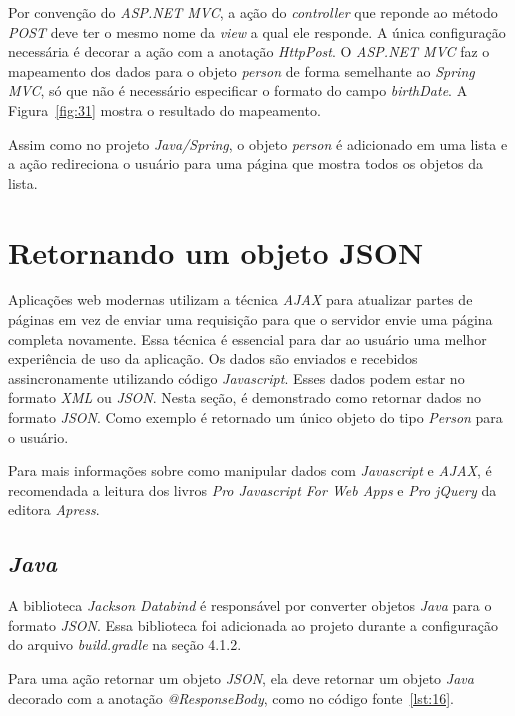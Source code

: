 Por convenção do \textit{ASP.NET MVC}, a ação do \textit{controller} que reponde ao método \textit{POST} deve ter o mesmo nome da \textit{view} a qual ele responde.  A única configuração necessária é decorar a ação com a anotação \textit{HttpPost}. O \textit{ASP.NET MVC} faz o mapeamento dos dados para o objeto \textit{person} de forma semelhante ao \textit{Spring MVC}, só que não é necessário especificar o formato do campo \textit{birthDate}. A Figura~\ref{fig:31} mostra o resultado do mapeamento.


Assim como no projeto \textit{Java/Spring}, o objeto \textit{person} é adicionado em uma lista e a ação redireciona o usuário para uma página que mostra todos os objetos da lista.

\section{Retornando um objeto JSON}

Aplicações web modernas utilizam a técnica \textit{AJAX} para atualizar partes de páginas em vez de enviar uma requisição para que o servidor envie uma página completa novamente. Essa técnica é essencial para dar ao usuário uma melhor experiência de uso da aplicação. Os dados são enviados e recebidos assincronamente utilizando código \textit{Javascript}. Esses dados podem estar no formato \textit{XML} ou \textit{JSON}. Nesta seção, é demonstrado como retornar dados no formato \textit{JSON}. Como exemplo é retornado um único objeto do tipo \textit{Person} para o usuário.

Para mais informações sobre como manipular dados com \textit{Javascript} e \textit{AJAX}, é recomendada a leitura dos livros \textit{Pro Javascript For Web Apps} \cite{20} e \textit{Pro jQuery} \cite{21} da editora \textit{Apress}.

\subsection{\textit{Java}}

A biblioteca \textit{Jackson Databind} é responsável por converter objetos \textit{Java} para o formato \textit{JSON}. Essa biblioteca foi adicionada ao projeto durante a configuração do arquivo \textit{build.gradle} na seção 4.1.2. 

Para uma ação retornar um objeto \textit{JSON}, ela deve retornar um objeto \textit{Java} decorado com a anotação \textit{@ResponseBody}, como no código fonte~\ref{lst:16}.

